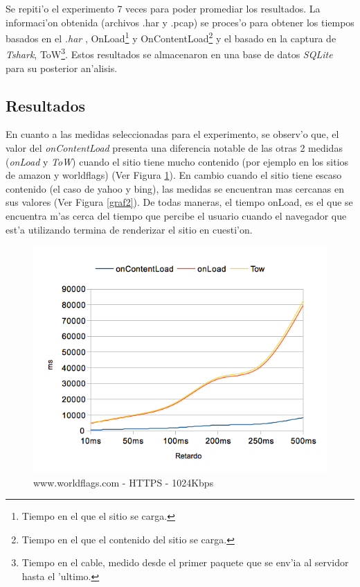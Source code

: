 \documentclass[a4paper,11pt,twocolumn]{article}
\begin{document}
Se repiti'o el experimento 7 veces para poder promediar los resultados. La informaci'on obtenida (archivos .har y .pcap) se proces'o para obtener los tiempos basados en el \emph{.har} \cite{harSpec}, OnLoad\footnote{Tiempo en el que el sitio se carga.} y OnContentLoad\footnote{Tiempo en el que el contenido del sitio se carga.} y el basado en la captura de \emph{Tshark}, ToW\footnote{Tiempo en el cable, medido desde el primer paquete que se env'ia al servidor hasta el 'ultimo.}. Estos resultados se almacenaron en una base de datos \emph{SQLite} \cite{SQLite} para su posterior an'alisis.

\subsection{Resultados}

En cuanto a las medidas seleccionadas para el experimento, se observ'o que, el valor del \emph{onContentLoad} presenta una diferencia notable de las otras 2 medidas (\emph{onLoad} y \emph{ToW}) cuando el sitio tiene mucho contenido (por ejemplo en los sitios de amazon y worldflags) (Ver Figura \ref{graf1}). En cambio cuando el sitio tiene escaso contenido (el caso de yahoo y bing), las medidas se encuentran mas cercanas en sus valores (Ver Figura \ref{graf2}). De todas maneras, el tiempo onLoad, es el que se encuentra m'as cerca del tiempo que percibe el usuario cuando el navegador que est'a utilizando termina de renderizar el sitio en cuesti'on.

\begin{figure}[h!]
  	\centering
	\includegraphics[scale=0.65]{exp1_1}
	\caption{\small www.worldflags.com - HTTPS - 1024Kbps}
	\label{graf1}
\end{figure}
\end{document}
